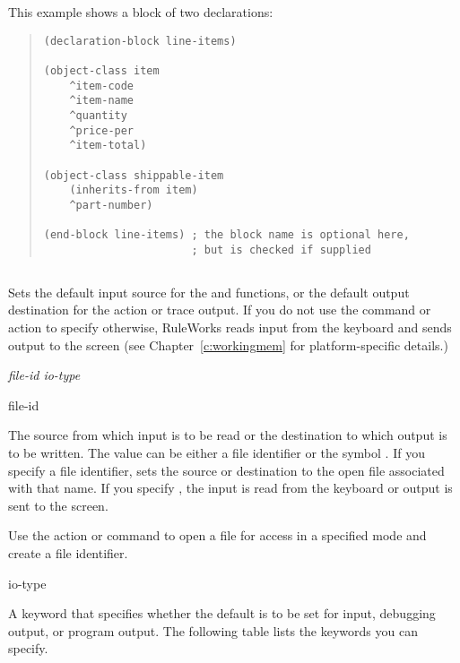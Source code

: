 \Example

This example shows a block of two  declarations:
\begin{quote}
\begin{verbatim}
(declaration-block line-items)

(object-class item
    ^item-code
    ^item-name
    ^quantity
    ^price-per
    ^item-total)

(object-class shippable-item
    (inherits-from item)
    ^part-number)

(end-block line-items) ; the block name is optional here,
                       ; but is checked if supplied
\end{verbatim}
\end{quote}
                    
\subsection{}

Sets the default input source for the  and
 functions, or the default output destination
for the  action or trace output. If you do not use the
 command or action to specify otherwise, RuleWorks reads
input from the keyboard and sends output to the screen (see Chapter~\ref{c:workingmem} for platform-specific details.)

\Format

 \it{file-id} \it{io-type}

\begin{arguments}
\item[file-id]

  The source from which input is to be read or the destination to
  which output is to be written. The value can be either a file
  identifier or the symbol . If you specify a file identifier,
   sets the source or destination to the open file
  associated with that name. If you specify , the input is
  read from the keyboard or output is sent to the screen.

  Use the  action or command to open a file for access in
  a specified mode and create a file identifier.

\item[io-type]

  A keyword that specifies whether the default is to be set for input,
  debugging output, or program output. The following table lists the
  keywords you can specify.
\end{arguments}


